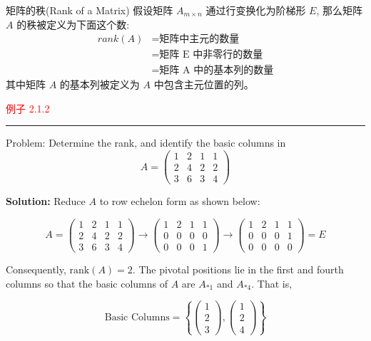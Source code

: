 \begin{bluebox}{矩阵的秩(Rank of a Matrix)}
假设矩阵 \(A_{m \times n}\) 通过行变换化为阶梯形 \(E\), 那么矩阵 \(A\) 的秩被定义为下面这个数:
\[
\begin{aligned} 
rank(A) & = \text{矩阵中主元的数量} \\ 
& = \text{矩阵 E 中非零行的数量} \\ 
& = \text{矩阵 A 中的基本列的数量} 
\end{aligned}
\]
其中矩阵 \(A\) 的基本列被定义为 \(A\) 中包含主元位置的列。
\end{bluebox}
 
\textcolor{red}{例子 2.1.2}
\color{red}\rule{\textwidth}{0.4pt}\color{black}

Problem: Determine the rank, and identify the basic columns in
\[
A = 
\begin{pmatrix}
1 & 2 & 1 & 1 \\
2 & 4 & 2 & 2 \\
3 & 6 & 3 & 4
\end{pmatrix}
\]

\textbf{Solution:} Reduce \( A \) to row echelon form as shown below:

\[
A = 
\begin{pmatrix}
1 & 2 & 1 & 1 \\
2 & 4 & 2 & 2 \\
3 & 6 & 3 & 4
\end{pmatrix}
\rightarrow
\begin{pmatrix}
1 & 2 & 1 & 1 \\
0 & 0 & 0 & 0 \\
0 & 0 & 0 & 1
\end{pmatrix}
\rightarrow
\begin{pmatrix}
1 & 2 & 1 & 1 \\
0 & 0 & 0 & 1 \\
0 & 0 & 0 & 0
\end{pmatrix}
= E
\]

Consequently, \( \text{rank}(A) = 2 \). The pivotal positions lie in the first and fourth columns so that the basic columns of \( A \) are \( A_{*1} \) and \( A_{*4} \). That is,

\[
\text{Basic Columns} = 
\left\{ 
\begin{pmatrix}
1 \\
2 \\
3
\end{pmatrix},
\begin{pmatrix}
1 \\
2 \\
4
\end{pmatrix}
\right\}
\]

